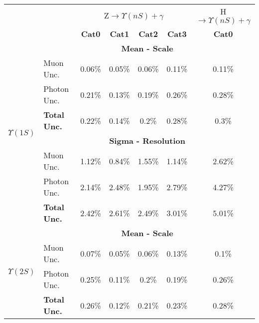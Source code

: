 

\begin{tabular}{cl|c|c|c|c|c|}
\cline{3-7}
\multicolumn{1}{l}{}                      &      & \multicolumn{4}{c|}{Z$\rightarrow \Upsilon(nS) + \gamma$} & H$\rightarrow \Upsilon(nS) + \gamma$ \\ \cline{3-7}
\multicolumn{1}{l}{}                      &                     & \textbf{Cat0}  & \textbf{Cat1}  & \textbf{Cat2}  & \textbf{Cat3} & \textbf{Cat0}        \\ \hline


\multicolumn{1}{|c|}{\multirow{8}{*}{$\Upsilon(1S)$}} & \multicolumn{6}{c|}{\textbf{Mean - Scale}} \\ \cline{2-7}
\multicolumn{1}{|c|}{}                    & Muon Unc.           & 0.06\% & 0.05\% & 0.06\% & 0.11\% & 0.11\% \\ \cline{2-7}
\multicolumn{1}{|c|}{}                    & Photon Unc.         & 0.21\% & 0.13\% & 0.19\% & 0.26\% & 0.28\% \\ \cline{2-7}
\multicolumn{1}{|c|}{}                    & \textbf{Total Unc.} & 0.22\% & 0.14\% & 0.2\% & 0.28\% & 0.3\% \\ \cline{2-7} 


\multicolumn{1}{|c|}{}                    & \multicolumn{6}{c|}{\textbf{Sigma - Resolution}}            \\ \cline{2-7}
\multicolumn{1}{|c|}{}                    & Muon Unc.           & 1.12\% & 0.84\% & 1.55\% & 1.14\% & 2.62\% \\ \cline{2-7}
\multicolumn{1}{|c|}{}                    & Photon Unc.         & 2.14\% & 2.48\% & 1.95\% & 2.79\% & 4.27\% \\ \cline{2-7}
\multicolumn{1}{|c|}{}                    & \textbf{Total Unc.} & 2.42\% & 2.61\% & 2.49\% & 3.01\% & 5.01\% \\ \hline \hline 



\multicolumn{1}{|c|}{\multirow{8}{*}{$\Upsilon(2S)$}} & \multicolumn{6}{c|}{\textbf{Mean - Scale}} \\ \cline{2-7}
\multicolumn{1}{|c|}{}                    & Muon Unc.           & 0.07\% & 0.05\% & 0.06\% & 0.13\% & 0.1\% \\ \cline{2-7}
\multicolumn{1}{|c|}{}                    & Photon Unc.         & 0.25\% & 0.11\% & 0.2\% & 0.19\% & 0.26\% \\ \cline{2-7}
\multicolumn{1}{|c|}{}                    & \textbf{Total Unc.} & 0.26\% & 0.12\% & 0.21\% & 0.23\% & 0.28\% \\ \cline{2-7} 



\end{tabular}
